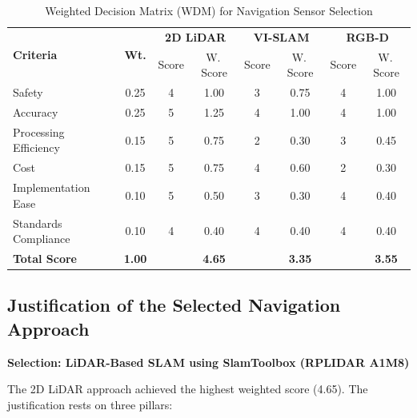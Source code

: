 \documentclass[12pt,a4paper]{report}
\renewcommand{\arraystretch}{1.45}
\renewcommand{\arraystretch}{1.3}
\begin{document}
\begin{table}[H]
\centering
\caption{Weighted Decision Matrix (WDM) for Navigation Sensor Selection}
\label{tab:wdm}
{\renewcommand{\arraystretch}{1.4}
\begin{tabularx}{\textwidth}{@{}Xc|cc|cc|cc@{}}
\toprule
\multirow{2}{*}{\textbf{Criteria}} & \multirow{2}{*}{\textbf{Wt.}} &
\multicolumn{2}{c|}{\textbf{2D LiDAR}} & \multicolumn{2}{c|}{\textbf{VI-SLAM}} & \multicolumn{2}{c}{\textbf{RGB-D}} \\
 & & Score & W.\,Score & Score & W.\,Score & Score & W.\,Score \\
\midrule
Safety                 & 0.25 & 4 & 1.00 & 3 & 0.75 & 4 & 1.00 \\
Accuracy               & 0.25 & 5 & 1.25 & 4 & 1.00 & 4 & 1.00 \\
Processing Efficiency  & 0.15 & 5 & 0.75 & 2 & 0.30 & 3 & 0.45 \\
Cost                   & 0.15 & 5 & 0.75 & 4 & 0.60 & 2 & 0.30 \\
Implementation Ease    & 0.10 & 5 & 0.50 & 3 & 0.30 & 4 & 0.40 \\
Standards Compliance   & 0.10 & 4 & 0.40 & 4 & 0.40 & 4 & 0.40 \\
\midrule
\rowcolor{lightgray}
\textbf{Total Score} & \textbf{1.00} & & \textbf{4.65} & & \textbf{3.35} & & \textbf{3.55} \\
\bottomrule
\end{tabularx}}
\end{table}

\subsection{Justification of the Selected Navigation Approach}

\textbf{Selection: LiDAR-Based SLAM using SlamToolbox (RPLIDAR A1M8)}

The 2D LiDAR approach achieved the highest weighted score (4.65). The justification rests on three pillars:
\end{document}
